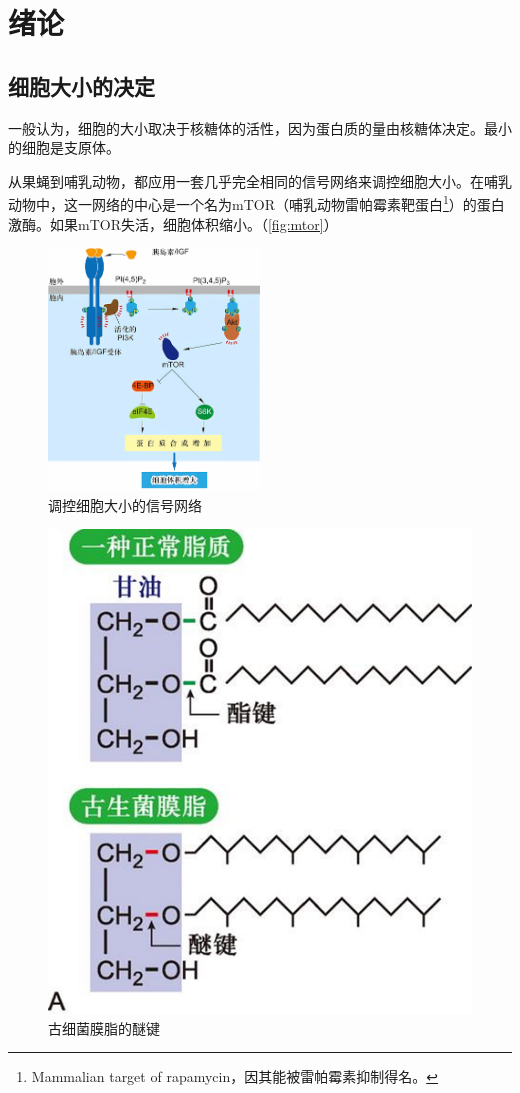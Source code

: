 \section{绪论}

\subsection{细胞大小的决定}

一般认为，细胞的大小取决于核糖体的活性，因为蛋白质的量由核糖体决定。最小的细胞是支原体。

从果蝇到哺乳动物，都应用一套几乎完全相同的信号网络来调控细胞大小。在哺乳动物中，这一网络的中心是一个名为mTOR（哺乳动物雷帕霉素靶蛋白\footnote{Mammalian target of rapamycin，因其能被雷帕霉素抑制得名。}）的蛋白激酶。如果mTOR失活，细胞体积缩小。（\autoref{fig:mtor}）

\begin{figure}[htbp]
	\centering
	\includegraphics[width=0.5\textwidth]{Pics/mTOR}
	\caption{调控细胞大小的信号网络}
	\label{fig:mtor}
\end{figure}

\begin{figure}[htbp]
	\centering
	\includegraphics[width=.3\textwidth]{Pics/古细菌的细胞膜}
	\caption{古细菌膜脂的醚键}
	\label{fig:archaealMembraneLipidEtherBonds}
\end{figure}

